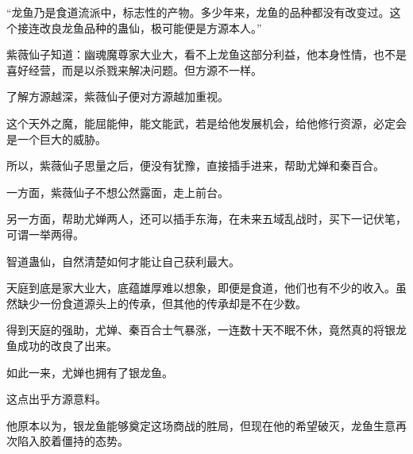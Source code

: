 \begin{this_body}
“龙鱼乃是食道流派中，标志性的产物。多少年来，龙鱼的品种都没有改变过。这个接连改良龙鱼品种的蛊仙，极可能便是方源本人。”

紫薇仙子知道：幽魂魔尊家大业大，看不上龙鱼这部分利益，他本身性情，也不是喜好经营，而是以杀戮来解决问题。但方源不一样。

了解方源越深，紫薇仙子便对方源越加重视。

这个天外之魔，能屈能伸，能文能武，若是给他发展机会，给他修行资源，必定会是一个巨大的威胁。

所以，紫薇仙子思量之后，便没有犹豫，直接插手进来，帮助尤婵和秦百合。

一方面，紫薇仙子不想公然露面，走上前台。

另一方面，帮助尤婵两人，还可以插手东海，在未来五域乱战时，买下一记伏笔，可谓一举两得。

智道蛊仙，自然清楚如何才能让自己获利最大。

天庭到底是家大业大，底蕴雄厚难以想象，即便是食道，他们也有不少的收入。虽然缺少一份食道源头上的传承，但其他的传承却是不在少数。

得到天庭的强助，尤婵、秦百合士气暴涨，一连数十天不眠不休，竟然真的将银龙鱼成功的改良了出来。

如此一来，尤婵也拥有了银龙鱼。

这点出乎方源意料。

他原本以为，银龙鱼能够奠定这场商战的胜局，但现在他的希望破灭，龙鱼生意再次陷入胶着僵持的态势。

\end{this_body}

